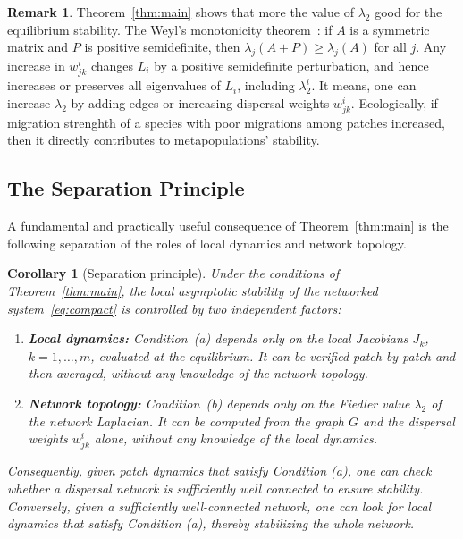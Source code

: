 \documentclass[12pt,a4paper]{article}
\newtheorem{corollary}[theorem]{Corollary}
\theoremstyle{definition}
\newtheorem{remark}[theorem]{Remark}
\begin{document}
\begin{remark}
\label{rem:weyl}
Theorem~\ref{thm:main} shows that more the value of $\lambda_2$ good for the equilibrium
stability. The Weyl's monotonicity theorem~\cite{bhatia2013}: if $A$ is a symmetric matrix and $P$ is positive semidefinite, then $\lambda_j(A+P) \geq \lambda_j(A)$ for all $j$. Any increase in $w^i_{jk}$ changes $L_i$ by a positive semidefinite perturbation, and hence increases or preserves all eigenvalues of $L_i$, including $\lambda^i_2$. It means, one can increase $\lambda_2$ by adding edges or increasing dispersal weights $w^i_{jk}$. Ecologically, if migration strenghth of a species with poor migrations among patches increased, then it directly contributes to metapopulations' stability. 

\end{remark}




\subsection{The Separation Principle}
\label{subsec:separation}

A fundamental and practically useful consequence of
Theorem~\ref{thm:main} is the following separation of the roles of
local dynamics and network topology.

\begin{corollary}[Separation principle]
\label{cor:separation}
Under the conditions of Theorem~\ref{thm:main}, the local asymptotic
stability of the networked system~\eqref{eq:compact} is controlled by
two independent factors:
\begin{enumerate}[label=(\roman*),itemsep=4pt]
  \item \textbf{Local dynamics:} Condition~(a) depends only on the
    local Jacobians $J_k$, $k = 1,\ldots,m$, evaluated at the
    equilibrium.
    It can be verified patch-by-patch and then averaged, without any
    knowledge of the network topology.
  \item \textbf{Network topology:} Condition~(b) depends only on the
    Fiedler value $\lambda_2$ of the network Laplacian.
    It can be computed from the graph $G$ and the dispersal weights
    $w^i_{jk}$ alone, without any knowledge of the local dynamics.
\end{enumerate}
Consequently, given patch dynamics that satisfy Condition (a), one can check whether a dispersal network is sufficiently well connected to ensure stability. Conversely, given a sufficiently well-connected network, one can look for local dynamics that satisfy Condition (a), thereby stabilizing the whole network.
\end{corollary}
\end{document}
